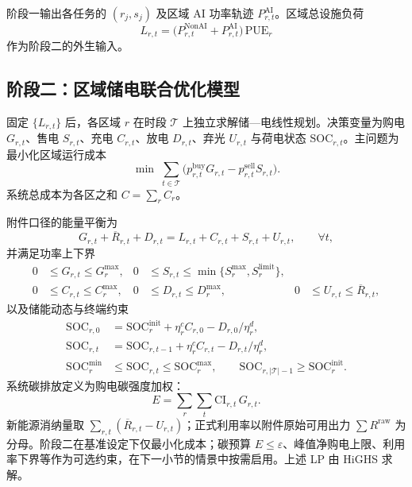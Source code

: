 阶段一输出各任务的 \((r_j,s_j)\) 及区域 AI 功率轨迹 \(P^{\mathrm{AI}}_{r,t}\)。区域总设施负荷
\begin{equation}
L_{r,t}
=
\bigl(P^{\mathrm{NonAI}}_{r,t}+P^{\mathrm{AI}}_{r,t}\bigr)\,\mathrm{PUE}_r
\end{equation}
作为阶段二的外生输入。

\subsection{阶段二：区域储电联合优化模型}

固定 \(\{L_{r,t}\}\) 后，各区域 \(r\) 在时段 \(\mathcal{T}\) 上独立求解储—电线性规划。决策变量为购电 \(G_{r,t}\)、售电 \(S_{r,t}\)、充电 \(C_{r,t}\)、放电 \(D_{r,t}\)、弃光 \(U_{r,t}\) 与荷电状态 \(\mathrm{SOC}_{r,t}\)。主问题为最小化区域运行成本
\begin{equation}
\min\;
\sum_{t\in\mathcal{T}}
\bigl(
p^{\mathrm{buy}}_{r,t}G_{r,t}
-
p^{\mathrm{sell}}_{r,t}S_{r,t}
\bigr).
\end{equation}
系统总成本为各区之和 \(C=\sum_r C_r\)。

附件口径的能量平衡为
\begin{equation}
G_{r,t}+\overline{R}_{r,t}+D_{r,t}
=
L_{r,t}+C_{r,t}+S_{r,t}+U_{r,t},
\qquad
\forall t,
\end{equation}
并满足功率上下界
\begin{equation}
\begin{aligned}
0&\le G_{r,t}\le G^{\max}_r,
&
0&\le S_{r,t}\le \min\{S^{\max}_r,S^{\mathrm{limit}}_r\},
\\
0&\le C_{r,t}\le C^{\max}_r,
&
0&\le D_{r,t}\le D^{\max}_r,
&
0&\le U_{r,t}\le \overline{R}_{r,t},
\end{aligned}
\end{equation}
以及储能动态与终端约束
\begin{equation}
\begin{aligned}
\mathrm{SOC}_{r,0}
&=
\mathrm{SOC}^{\mathrm{init}}_r+\eta^c_r C_{r,0}-D_{r,0}/\eta^d_r,
\\
\mathrm{SOC}_{r,t}
&=
\mathrm{SOC}_{r,t-1}+\eta^c_r C_{r,t}-D_{r,t}/\eta^d_r,
\\
\mathrm{SOC}^{\min}_r
&\le
\mathrm{SOC}_{r,t}
\le
\mathrm{SOC}^{\max}_r,
\qquad
\mathrm{SOC}_{r,|\mathcal{T}|-1}
\ge
\mathrm{SOC}^{\mathrm{init}}_r.
\end{aligned}
\end{equation}
系统碳排放定义为购电碳强度加权：
\begin{equation}
E
=
\sum_{r}\sum_{t}
\mathrm{CI}_{r,t}\,G_{r,t}.
\end{equation}
新能源消纳量取 \(\sum_{r,t}(\overline{R}_{r,t}-U_{r,t})\)；正式利用率以附件原始可用出力 \(\sum R^{\mathrm{raw}}\) 为分母。阶段二在基准设定下仅最小化成本；碳预算 \(E\le\varepsilon\)、峰值净购电上限、利用率下界等作为可选约束，在下一小节的情景中按需启用。上述 LP 由 HiGHS 求解。

